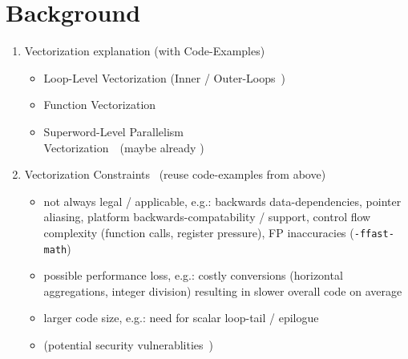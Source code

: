 \documentclass[sigplan,11pt,nonacm]{acmart}
\begin{document}
\section{Background}
\label{sec:background}
\begin{enumerate}
  \item Vectorization explanation (with Code\hyp{}Examples)
  \begin{itemize}
    \item Loop-Level Vectorization (Inner / Outer-Loops~\cite{llvmextloopvec,intelouterloop,10.5555/2337159.2337210,llvmouterloop,10.1145/1454115.1454119})
    \item Function Vectorization~\cite{llvmextloopvec}
    \item Superword-Level Parallelism\\Vectorization~\cite{10.1145/349299.349320}~(maybe already \cite{10.1145/3519939.3523701})
  \end{itemize}
  \item Vectorization Constraints~\cite{llvmveccontrolflow,intelvecessen} (reuse code\hyp{}examples from above)
  \begin{itemize}
    \item not always legal / applicable, e.g.: backwards data-dependencies, pointer aliasing, 
    platform backwards-compatability / support, control flow complexity (function calls, register pressure), FP inaccuracies (\texttt{-ffast-math})
    \item possible performance loss, e.g.: costly conversions (horizontal aggregations, integer division) resulting in slower overall code
    on average
    \item larger code size, e.g.: need for scalar loop-tail / epilogue
    \item (potential security vulnerablities~\cite{2023arXiv230201131K})
  \end{itemize}
\end{enumerate}


\end{document}
